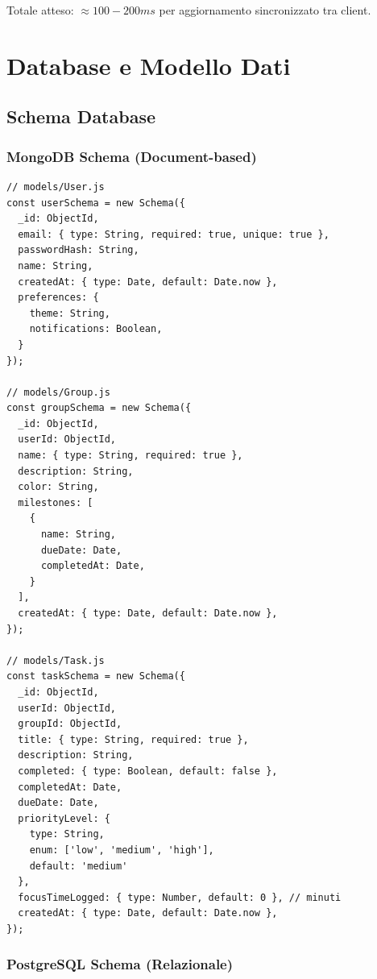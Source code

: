 \documentclass[12pt,a4paper]{report}
\begin{document}
Totale atteso: $\approx 100-200ms$ per aggiornamento sincronizzato tra client.

\newpage

\chapter{Database e Modello Dati}

\section{Schema Database}

\subsection{MongoDB Schema (Document-based)}

\begin{lstlisting}
// models/User.js
const userSchema = new Schema({
  _id: ObjectId,
  email: { type: String, required: true, unique: true },
  passwordHash: String,
  name: String,
  createdAt: { type: Date, default: Date.now },
  preferences: {
    theme: String,
    notifications: Boolean,
  }
});

// models/Group.js
const groupSchema = new Schema({
  _id: ObjectId,
  userId: ObjectId,
  name: { type: String, required: true },
  description: String,
  color: String,
  milestones: [
    {
      name: String,
      dueDate: Date,
      completedAt: Date,
    }
  ],
  createdAt: { type: Date, default: Date.now },
});

// models/Task.js
const taskSchema = new Schema({
  _id: ObjectId,
  userId: ObjectId,
  groupId: ObjectId,
  title: { type: String, required: true },
  description: String,
  completed: { type: Boolean, default: false },
  completedAt: Date,
  dueDate: Date,
  priorityLevel: {
    type: String,
    enum: ['low', 'medium', 'high'],
    default: 'medium'
  },
  focusTimeLogged: { type: Number, default: 0 }, // minuti
  createdAt: { type: Date, default: Date.now },
});
\end{lstlisting}

\subsection{PostgreSQL Schema (Relazionale)}
\end{document}
